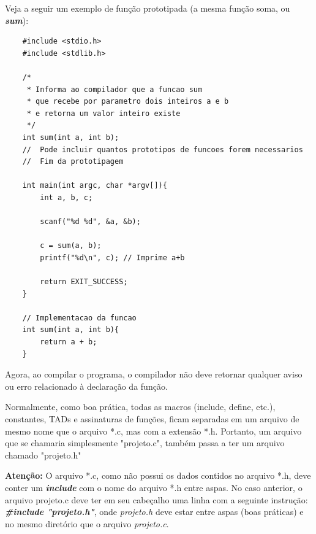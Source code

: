 \documentclass[12pt]{article}
\newcommand\tab[1][1cm]{\hspace*{#1}}
\begin{document}
\par\tab Veja a seguir um exemplo de função prototipada (a mesma função soma, ou \textit{\textbf{sum}}):

\hspace{0.25cm}
\begin{lstlisting}
    #include <stdio.h>
    #include <stdlib.h>
    
    /*
     * Informa ao compilador que a funcao sum
     * que recebe por parametro dois inteiros a e b
     * e retorna um valor inteiro existe
     */
    int sum(int a, int b);
    //  Pode incluir quantos prototipos de funcoes forem necessarios
    //  Fim da prototipagem
    
    int main(int argc, char *argv[]){
        int a, b, c;
        
        scanf("%d %d", &a, &b);
        
        c = sum(a, b);
        printf("%d\n", c); // Imprime a+b
        
        return EXIT_SUCCESS;
    }
    
    // Implementacao da funcao
    int sum(int a, int b){
        return a + b;
    }
\end{lstlisting}

\par\tab Agora, ao compilar o programa, o compilador não deve retornar qualquer aviso ou erro relacionado à declaração da função.

\hspace{0.25cm}
\begin{tcolorbox}[colback=green!5!white,colframe=green!75!black,title=Curiosidade]
  \par\tab Normalmente, como boa prática, todas as macros (include, define, etc.), constantes, TADs e assinaturas de funções, ficam separadas em um arquivo de mesmo nome que o arquivo *.c, mas com a extensão *.h. Portanto, um arquivo que se chamaria simplesmente "projeto.c", também passa a ter um arquivo chamado "projeto.h"
  \par\tab \textbf{Atenção:} O arquivo *.c, como não possui os dados contidos no arquivo *.h, deve conter um \textit{\textbf{include}} com o nome do arquivo *.h entre aspas. No caso anterior, o arquivo projeto.c deve ter em seu cabeçalho uma linha com a seguinte instrução: \textbf{\textit{\#include "projeto.h"}}, onde \textit{projeto.h} deve estar entre aspas (boas práticas) e no mesmo diretório que o arquivo \textit{projeto.c}.
\end{tcolorbox}
\end{document}
